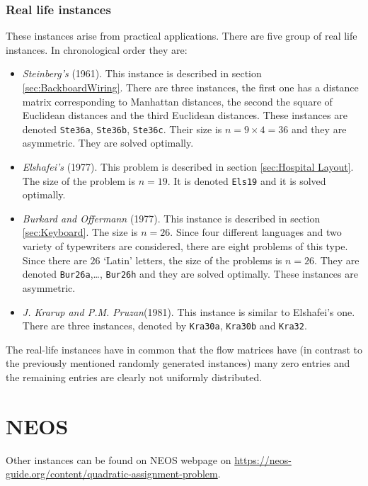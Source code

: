 \subsubsection{Real life instances}
These instances arise from practical applications. There are five group of real life instances. In chronological order they are:
\begin{itemize}
	
	\item \textit{Steinberg's} \cite{Steinberg1961} (1961). This instance is described in section \ref{sec:BackboardWiring}. There are three instances, the first one has a distance matrix corresponding to Manhattan distances, the
	second the square of Euclidean distances and the third Euclidean distances. These instances are denoted \texttt{Ste36a}, \texttt{Ste36b}, \texttt{Ste36c}. Their size is $n = 9 \times  4 = 36$ and they are asymmetric. They are solved optimally.
	
	\item \textit{Elshafei’s} (1977). This problem is described in section \ref{sec:Hospital Layout}. The size of the problem is $n = 19$. It is denoted \texttt{Els19} and it is solved optimally. 
	
	\item \textit{Burkard and Offermann} (1977). This instance is described in section \ref{sec:Keyboard}. The size is $n=26$. Since four different languages and two variety of typewriters are considered, there are eight problems of this type. Since there are $26$ ‘Latin' letters, the size of the problems is $n = 26$. They are denoted 	\texttt{Bur26a},\dots , \texttt{Bur26h} and they are solved optimally. These instances are asymmetric.
	
	\item \textit{J. Krarup and P.M. Pruzan}(1981). This instance is similar to Elshafei's one. There are three instances, denoted by \texttt{Kra30a}, \texttt{Kra30b} and \texttt{Kra32}.
\end{itemize}

The real-life instances have in common that the flow matrices have (in contrast to the previously mentioned randomly generated instances) many zero entries and the remaining entries are clearly not uniformly distributed.




\section{NEOS}
\label{sec:NEOS}
Other instances can be found on NEOS  webpage on  \url{https://neos-guide.org/content/quadratic-assignment-problem}.


